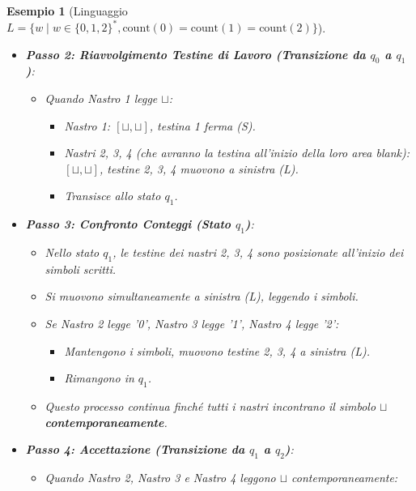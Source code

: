 \documentclass[a4paper]{article}
\newtheorem{example}{Esempio}
\begin{document}
\begin{example}[Linguaggio $L = \{w \mid w \in \{0,1,2\}^*, \text{count}(0)=\text{count}(1)=\text{count}(2)\}$]
\begin{itemize}
\begin{itemize}
            \item Questo continua finché il Nastro 1 non incontra $\sqcup$.
        \end{itemize}
    \item \textbf{Passo 2: Riavvolgimento Testine di Lavoro (Transizione da $q_0$ a $q_1$)}:
        \begin{itemize}
            \item Quando Nastro 1 legge $\sqcup$:
                \begin{itemize}
                    \item Nastro 1: $[\sqcup, \sqcup]$, testina 1 ferma (S).
                    \item Nastri 2, 3, 4 (che avranno la testina all'inizio della loro area blank): $[\sqcup, \sqcup]$, testine 2, 3, 4 muovono a sinistra (L).
                    \item Transisce allo stato $q_1$.
                \end{itemize}
        \end{itemize}
    \item \textbf{Passo 3: Confronto Conteggi (Stato $q_1$)}:
        \begin{itemize}
            \item Nello stato $q_1$, le testine dei nastri 2, 3, 4 sono posizionate all'inizio dei simboli scritti.
            \item Si muovono simultaneamente a sinistra (L), leggendo i simboli.
            \item Se Nastro 2 legge '0', Nastro 3 legge '1', Nastro 4 legge '2':
                \begin{itemize}
                    \item Mantengono i simboli, muovono testine 2, 3, 4 a sinistra (L).
                    \item Rimangono in $q_1$.
                \end{itemize}
            \item Questo processo continua finché tutti i nastri incontrano il simbolo $\sqcup$ \textbf{contemporaneamente}.
        \end{itemize}
    \item \textbf{Passo 4: Accettazione (Transizione da $q_1$ a $q_2$)}:
        \begin{itemize}
            \item Quando Nastro 2, Nastro 3 e Nastro 4 leggono $\sqcup$ contemporaneamente:
                \begin{itemize}

\end{itemize}
\end{itemize}
\end{itemize}
\end{example}
\end{document}
